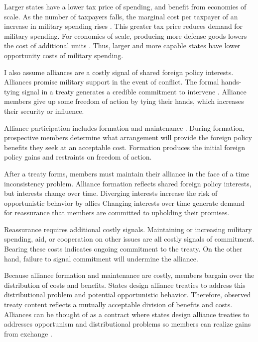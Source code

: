 \documentclass[12pt]{article}
\begin{document}
Larger states have a lower tax price of spending, and benefit from economies of scale. 
As the number of taxpayers falls, the marginal cost per taxpayer of an increase in military spending rises \citep{DudleyMontmarquette1981}. 
This greater tax price reduces demand for military spending. 
For economies of scale, producing more defense goods lowers the cost of additional units \citep{Moravcsik1991, AlesinaSpolaore2006}. 
Thus, larger and more capable states have lower opportunity costs of military spending. 


I also assume alliances are a costly signal of shared foreign policy interests. 
Alliances promise military support in the event of conflict. 
The formal hands-tying signal in a treaty generates a credible commitment to intervene \citep{Fearon1997, Leeds2003}.
Alliance members give up some freedom of action by tying their hands, which increases their security or influence. 


Alliance participation includes formation and maintenance \citep{Snyder1997}. 
During formation, prospective members determine what arrangement will provide the foreign policy benefits they seek at an acceptable cost. 
Formation produces the initial foreign policy gains and restraints on freedom of action. 


After a treaty forms, members must maintain their alliance in the face of a time inconsistency problem. 
Alliance formation reflects shared foreign policy interests, but interests change over time. 
Diverging interests increase the risk of opportunistic behavior by allies \citep{Leeds2003a, LeedsSavun2007}
Changing interests over time generate demand for reassurance that members are committed to upholding their promises. 


Reassurance requires additional costly signals. 
Maintaining or increasing military spending, aid, or cooperation on other issues are all costly signals of commitment. 
Bearing these costs indicates ongoing commitment to the treaty. 
On the other hand, failure to signal commitment will undermine the alliance. 


Because alliance formation and maintenance are costly, members bargain over the distribution of costs and benefits.
States design alliance treaties to address this distributional problem and potential opportunistic behavior. 
Therefore, observed treaty content reflects a mutually acceptable division of benefits and costs. 
Alliances can be thought of as a contract where states design alliance treaties to addresses opportunism and distributional problems \citep{Williamson1985, Koremenosetal2001} so members can realize gains from exchange \citep{Lake1996, Bensonetal2014}.
\end{document}
